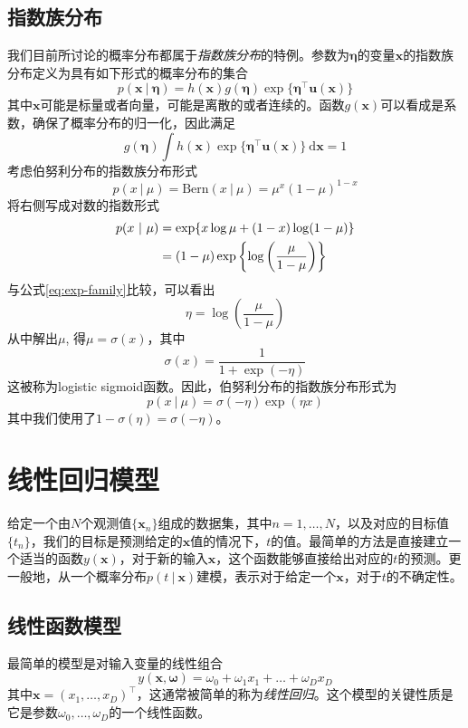 \documentclass[11pt]{ctexbook}
\begin{document}
\section{指数族分布}
我们目前所讨论的概率分布都属于\emph{指数族分布}的特例。参数为$\bm\eta$的变量$\bm x$的指数族分布定义为具有如下形式的概率分布的集合
\begin{equation}
	\label{eq:exp-family}
	p(\bm x\ |\ \bm\eta) = h(\bm x)g(\bm \eta)\exp\{\bm\eta^\top\bm u(\bm x) \}
\end{equation}
其中$\bm x$可能是标量或者向量，可能是离散的或者连续的。函数$g(\bm x)$可以看成是系数，确保了概率分布的归一化，因此满足
\begin{equation}
	g(\bm\eta)\int h(\bm x)\exp\{\bm \eta^\top\bm u(\bm x)\} \ \mathrm{d}\bm x = 1
\end{equation}
考虑伯努利分布的指数族分布形式
\begin{equation}
	p(x\ |\ \mu) = \mathrm{Bern}(x\ |\ \mu) = \mu^x(1-\mu)^{1-x}
\end{equation}
将右侧写成对数的指数形式
\begin{align}
	p(x\ |\ \mu) &= \exp\{x\log \mu + (1-x)\log (1-\mu)\} \notag \\
	&= (1-\mu)\exp\left\{ \log\left( \frac{\mu}{1-\mu} \right) \right\}
\end{align}
与公式\ref{eq:exp-family}比较，可以看出
\begin{equation}
	\eta = \log\left( \frac{\mu}{1-\mu}\right)	
\end{equation}
从中解出$\mu$, 得$\mu=\sigma(x)$，其中
\begin{equation}
	\sigma(x) = \frac{1}{1+\exp(-\eta)}
\end{equation}
这被称为logistic sigmoid函数。因此，伯努利分布的指数族分布形式为
\begin{equation}
	p(x\ |\ \mu) = \sigma(-\eta)\exp(\eta x)
\end{equation}
其中我们使用了$1-\sigma(\eta)=\sigma(-\eta)$。
\chapter{线性回归模型}
给定一个由$N$个观测值$\{\bm x_n\}$组成的数据集，其中$n=1, \ldots, N$，以及对应的目标值$\{t_n\}$，我们的目标是预测给定的$\bm x$值的情况下，$t$的值。最简单的方法是直接建立一个适当的函数$y(\bm x)$，对于新的输入$\bm x$，这个函数能够直接给出对应的$t$的预测。更一般地，从一个概率分布$p(t\ |\ \bm x)$建模，表示对于给定一个$\bm x$，对于$t$的不确定性。
\section{线性函数模型}
最简单的模型是对输入变量的线性组合
\begin{equation}
	y(\bm x, \bm \omega) = \omega_0 + \omega_1 x_1 + \ldots +\omega_D x_D
\end{equation}
其中$\bm x=(x_1, \ldots, x_D)^\top$，这通常被简单的称为\emph{线性回归}。这个模型的关键性质是它是参数$\omega_0, \ldots, \omega_D$的一个线性函数。
\end{document}
